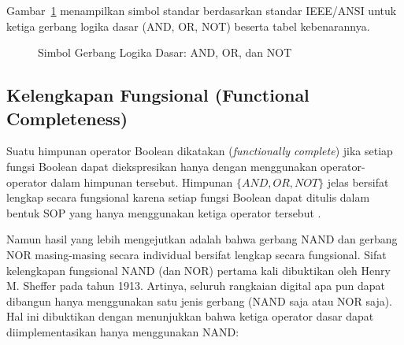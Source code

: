 Gambar~\ref{fig:gerbang-dasar} menampilkan simbol standar berdasarkan standar IEEE/ANSI untuk ketiga gerbang logika dasar (AND, OR, NOT) beserta tabel kebenarannya.

\begin{figure}[H]
\centering
{}
\caption{Simbol Gerbang Logika Dasar: AND, OR, dan NOT}
\label{fig:gerbang-dasar}
\end{figure}

\subsection{Kelengkapan Fungsional (Functional Completeness)}

Suatu himpunan operator Boolean dikatakan  (\textit{functionally complete}) jika setiap fungsi Boolean dapat diekspresikan hanya dengan menggunakan operator-operator dalam himpunan tersebut. Himpunan $\{AND, OR, NOT\}$ jelas bersifat lengkap secara fungsional karena setiap fungsi Boolean dapat ditulis dalam bentuk SOP yang hanya menggunakan ketiga operator tersebut \cite{rosen2019}.

Namun hasil yang lebih mengejutkan adalah bahwa gerbang NAND dan gerbang NOR masing-masing secara individual bersifat lengkap secara fungsional. Sifat kelengkapan fungsional NAND (dan NOR) pertama kali dibuktikan oleh Henry M. Sheffer pada tahun 1913. Artinya, seluruh rangkaian digital apa pun dapat dibangun hanya menggunakan satu jenis gerbang (NAND saja atau NOR saja). Hal ini dibuktikan dengan menunjukkan bahwa ketiga operator dasar dapat diimplementasikan hanya menggunakan NAND:

